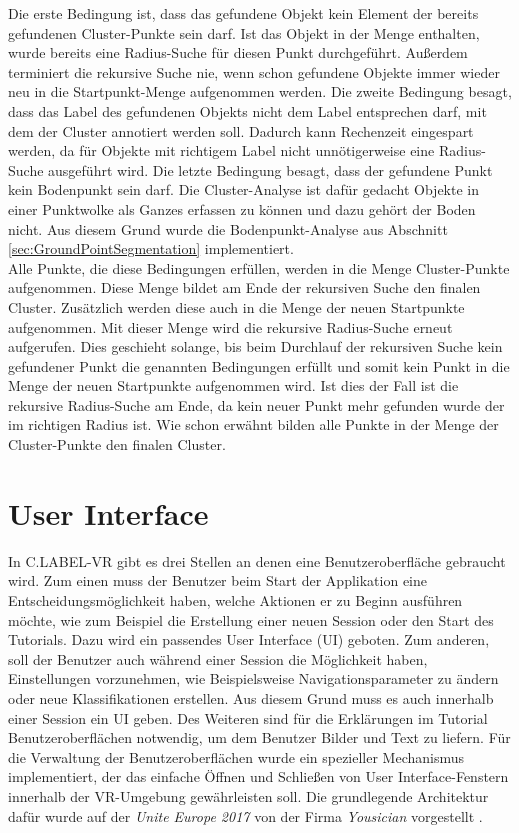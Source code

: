 Die erste Bedingung ist, dass das gefundene Objekt kein Element der bereits gefundenen Cluster-Punkte sein darf. Ist das Objekt in der Menge enthalten, wurde bereits eine Radius-Suche für diesen Punkt durchgeführt. Außerdem terminiert die rekursive Suche nie, wenn schon gefundene Objekte immer wieder neu in die Startpunkt-Menge aufgenommen werden. Die zweite Bedingung besagt, dass das Label des gefundenen Objekts nicht dem Label entsprechen darf, mit dem der Cluster annotiert werden soll. Dadurch kann Rechenzeit eingespart werden, da für Objekte mit richtigem Label nicht unnötigerweise eine Radius-Suche ausgeführt wird. Die letzte Bedingung besagt, dass der gefundene Punkt kein Bodenpunkt sein darf. Die Cluster-Analyse ist dafür gedacht Objekte in einer Punktwolke als Ganzes erfassen zu können und dazu gehört der Boden nicht. Aus diesem Grund wurde die Bodenpunkt-Analyse aus Abschnitt \ref{sec:GroundPointSegmentation} implementiert.\\

Alle Punkte, die diese Bedingungen erfüllen, werden in die Menge Cluster-Punkte aufgenommen. Diese Menge bildet am Ende der rekursiven Suche den finalen Cluster. Zusätzlich werden diese auch in die Menge der neuen Startpunkte aufgenommen. Mit dieser Menge wird die rekursive Radius-Suche erneut aufgerufen. Dies geschieht solange, bis beim Durchlauf der rekursiven Suche kein gefundener Punkt die genannten Bedingungen erfüllt und somit kein Punkt in die Menge der neuen Startpunkte aufgenommen wird. Ist dies der Fall ist die rekursive Radius-Suche am Ende, da kein neuer Punkt mehr gefunden wurde der im richtigen Radius ist. Wie schon erwähnt bilden alle Punkte in der Menge der Cluster-Punkte den finalen Cluster.  

\section{User Interface}
\label{sec:UIMenu}
In C.LABEL-VR gibt es drei Stellen an denen eine Benutzeroberfläche gebraucht wird. Zum einen muss der Benutzer beim Start der Applikation eine Entscheidungsmöglichkeit haben, welche Aktionen er zu Beginn ausführen möchte, wie zum Beispiel die Erstellung einer neuen Session oder den Start des Tutorials. Dazu wird ein passendes User Interface (UI) geboten. Zum anderen, soll der Benutzer auch während einer Session die Möglichkeit haben, Einstellungen vorzunehmen, wie Beispielsweise Navigationsparameter zu ändern oder neue Klassifikationen erstellen. Aus diesem Grund muss es auch innerhalb einer Session ein UI geben. Des Weiteren sind für die Erklärungen im Tutorial Benutzeroberflächen notwendig, um dem Benutzer Bilder und Text zu liefern. Für die Verwaltung der Benutzeroberflächen wurde ein spezieller Mechanismus implementiert, der das einfache Öffnen und Schließen von User Interface-Fenstern innerhalb der VR-Umgebung gewährleisten soll. Die grundlegende Architektur dafür wurde auf der \textit{Unite Europe 2017} von der Firma \textit{Yousician} vorgestellt \cite{bib:UnityMenuSystem}.\\

